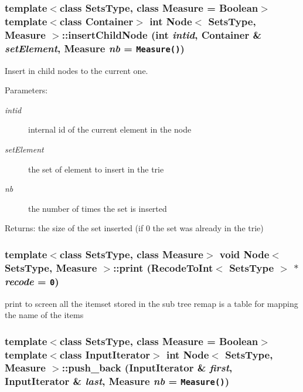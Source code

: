 \subsubsection{\setlength{\rightskip}{0pt plus 5cm}template$<$class Sets\-Type, class Measure = Boolean$>$ template$<$class Container$>$ int {\bf Node}$<$ Sets\-Type, Measure $>$::insert\-Child\-Node (int {\em intid}, Container \& {\em set\-Element}, Measure {\em nb} = {\tt Measure()})\hspace{0.3cm}{\tt  [inline]}}\label{class_node_d1a110523a143505c594b0be9ae65626}


Insert in child nodes to the current one. 

\begin{Desc}
\item[Parameters:]
\begin{description}
\item[{\em intid}]internal id of the current element in the node \item[{\em set\-Element}]the set of element to insert in the trie \item[{\em nb}]the number of times the set is inserted \end{description}
\end{Desc}
\begin{Desc}
\item[Returns:]the size of the set inserted (if 0 the set was already in the trie) \end{Desc}
\subsubsection{\setlength{\rightskip}{0pt plus 5cm}template$<$class Sets\-Type, class Measure$>$ void {\bf Node}$<$ Sets\-Type, Measure $>$::print ({\bf Recode\-To\-Int}$<$ Sets\-Type $>$ $\ast$ {\em recode} = {\tt 0})}\label{class_node_f4040669d0f5f254a01a07b631fceec0}


print to screen all the itemset stored in the sub tree remap is a table for mapping the name of the items 
\subsubsection{\setlength{\rightskip}{0pt plus 5cm}template$<$class Sets\-Type, class Measure = Boolean$>$ template$<$class Input\-Iterator$>$ int {\bf Node}$<$ Sets\-Type, Measure $>$::push\_\-back (Input\-Iterator \& {\em first}, Input\-Iterator \& {\em last}, Measure {\em nb} = {\tt Measure()})\hspace{0.3cm}{\tt  [inline]}}\label{class_node_6fd6696c9ee3f0b189b0d8f00ff53b34}


